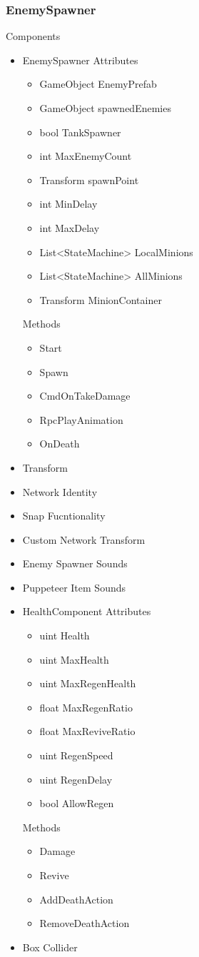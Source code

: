 \documentclass[11pt]{article}
\begin{document}
\subsubsection{EnemySpawner}
Components
\begin{itemize}
	\item EnemySpawner
	\newline Attributes
	\begin{itemize}
		\item GameObject EnemyPrefab
		\item GameObject spawnedEnemies
		\item bool TankSpawner
		\item int MaxEnemyCount
		\item Transform spawnPoint
		\item int MinDelay
		\item int MaxDelay
		\item List<StateMachine> LocalMinions
		\item List<StateMachine> AllMinions
		\item Transform MinionContainer
	\end{itemize}
	Methods
	\begin{itemize}
		\item Start
		\item Spawn
		\item CmdOnTakeDamage
		\item RpcPlayAnimation
		\item OnDeath
	\end{itemize}
	\item Transform
	\item Network Identity
	\item Snap Fucntionality
	\item Custom Network Transform
	\item Enemy Spawner Sounds
	\item Puppeteer Item Sounds
\newpage
	\item HealthComponent
	\newline Attributes
	\begin{itemize}
		\item uint Health
		\item uint MaxHealth
		\item uint MaxRegenHealth
		\item float MaxRegenRatio
		\item float MaxReviveRatio
		\item uint RegenSpeed
		\item uint RegenDelay
		\item bool AllowRegen
	\end{itemize}
	Methods
	\begin{itemize}
		\item Damage
		\item Revive
		\item AddDeathAction
		\item RemoveDeathAction
	\end{itemize}
	\item Box Collider
\end{itemize}
\end{document}
